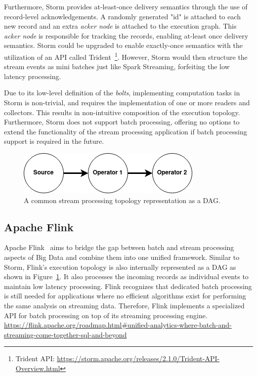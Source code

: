 Furthermore, Storm provides at-least-once 
delivery semantics through the use of record-level acknowledgements. A randomly 
generated "id" is attached to each new record and an extra \emph{acker node} is attached 
to the execution graph. This \emph{acker node} is responsible for tracking the records, 
enabling at-least once delivery semantics. Storm could be upgraded to enable 
exactly-once semantics with the utilization of an API called
Trident~\footnote{Trident API: \url{https://storm.apache.org/releases/2.1.0/Trident-API-Overview.html}}. 
However, Storm would then structure the stream events as mini batches just like 
Spark Streaming, forfeiting the low latency processing. 

Due to its low-level definition of the \emph{bolts}, implementing computation tasks 
in Storm is non-trivial, and requires the implementation of one or more readers and 
collectors. This results in non-intuitive composition of the execution topology. 
Furthermore, Storm does not support 
batch processing, offering no options to extend the functionality of the stream 
processing application if batch processing support is required in the future. 


\begin{figure}[!htpb]
    \centering
    \includegraphics[width=0.5\linewidth]{fig/dag.png}
    \caption{A common stream processing topology representation as a DAG.} 
    \label{fig:dag_topology}
\end{figure}

\subsection{Apache Flink}%
\label{sub:Apache Flink}

Apache Flink~\cite{flink} aims to bridge the gap between batch and stream processing aspects of 
Big Data and combine them into one unified framework. Similar to Storm, 
Flink's execution topology is also internally represented as a DAG as shown 
in Figure~\ref{fig:dag_topology}. It also processes the incoming records as 
individual events to maintain low latency processing. Flink recognizes that
dedicated batch processing is still needed for applications where no efficient algorithms 
exist for performing the same analysis on streaming data. Therefore, Flink implements a 
specialized API for batch processing on top of its streaming processing engine.
 \url{https://flink.apache.org/roadmap.html#unified-analytics-where-batch-and-streaming-come-together-sql-and-beyond} 

